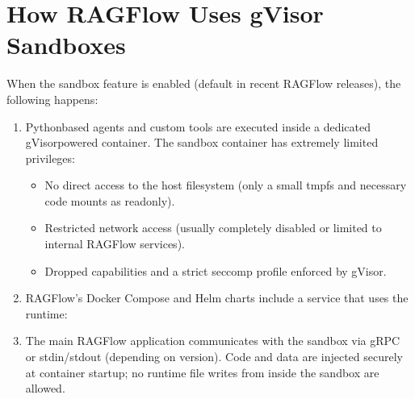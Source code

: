 \documentclass[letterpaper,10pt,english]{sphinxmanual}
\begin{document}
\section{How RAGFlow Uses gVisor Sandboxes}
\label{\detokenize{gvisor:how-ragflow-uses-gvisor-sandboxes}}
\sphinxAtStartPar
When the sandbox feature is enabled (default in recent RAGFlow releases), the following happens:
\begin{enumerate}
%
\item {} 
\sphinxAtStartPar
{}
\sphinxhyphen{} Python\sphinxhyphen{}based agents and custom tools are executed inside a dedicated gVisor\sphinxhyphen{}powered container.
\sphinxhyphen{} The sandbox container has extremely limited privileges:
\begin{itemize}
\item {} 
\sphinxAtStartPar
No direct access to the host filesystem (only a small tmpfs and necessary code mounts as read\sphinxhyphen{}only).

\item {} 
\sphinxAtStartPar
Restricted network access (usually completely disabled or limited to internal RAGFlow services).

\item {} 
\sphinxAtStartPar
Dropped capabilities and a strict seccomp profile enforced by gVisor.

\end{itemize}

\item {} 
\sphinxAtStartPar
{}
\sphinxhyphen{} RAGFlow’s Docker Compose and Helm charts include a  service that uses the  runtime:
\begin{quote}

\begin{sphinxVerbatim}[commandchars=\\\{\}]
\end{sphinxVerbatim}
\end{quote}

\item {} 
\sphinxAtStartPar
{}
\sphinxhyphen{} The main RAGFlow application communicates with the sandbox via gRPC or stdin/stdout (depending on version).
\sphinxhyphen{} Code and data are injected securely at container startup; no runtime file writes from inside the sandbox are allowed.

\end{enumerate}
\end{document}
